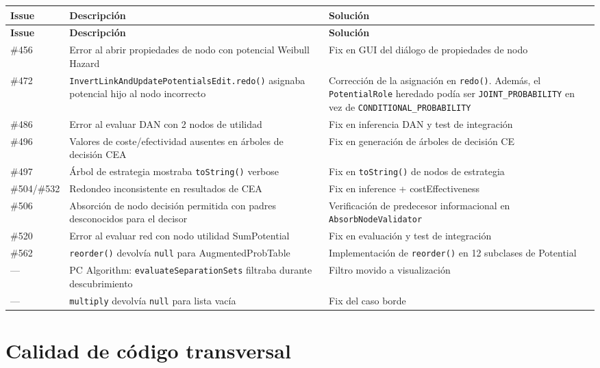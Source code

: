 \documentclass[11pt,a4paper]{article}
\begin{document}
\begin{longtable}{p{1.2cm}p{5cm}p{6.5cm}}
\toprule
\textbf{Issue} & \textbf{Descripción} & \textbf{Solución} \\
\midrule
\endfirsthead
\toprule
\textbf{Issue} & \textbf{Descripción} & \textbf{Solución} \\
\midrule
\endhead
\#456 & Error al abrir propiedades de nodo con potencial Weibull Hazard & Fix en GUI del diálogo de propiedades de nodo \\
\#472 & \texttt{InvertLinkAndUpdatePotentialsEdit.redo()} asignaba potencial hijo al nodo incorrecto & Corrección de la asignación en \texttt{redo()}. Además, el \texttt{PotentialRole} heredado podía ser \texttt{JOINT\_PROBABILITY} en vez de \texttt{CONDITIONAL\_PROBABILITY} \\
\#486 & Error al evaluar DAN con 2 nodos de utilidad & Fix en inferencia DAN y test de integración \\
\#496 & Valores de coste/efectividad ausentes en árboles de decisión CEA & Fix en generación de árboles de decisión CE \\
\#497 & Árbol de estrategia mostraba \texttt{toString()} verbose & Fix en \texttt{toString()} de nodos de estrategia \\
\#504/\#532 & Redondeo inconsistente en resultados de CEA & Fix en inference + costEffectiveness \\
\#506 & Absorción de nodo decisión permitida con padres desconocidos para el decisor & Verificación de predecesor informacional en \texttt{AbsorbNodeValidator} \\
\#520 & Error al evaluar red con nodo utilidad SumPotential & Fix en evaluación y test de integración \\
\#562 & \texttt{reorder()} devolvía \texttt{null} para AugmentedProbTable & Implementación de \texttt{reorder()} en 12 subclases de Potential \\
--- & PC Algorithm: \texttt{evaluateSeparationSets} filtraba durante descubrimiento & Filtro movido a visualización \\
--- & \texttt{multiply} devolvía \texttt{null} para lista vacía & Fix del caso borde \\
\bottomrule
\end{longtable}

\section{Calidad de código transversal}
\end{document}
